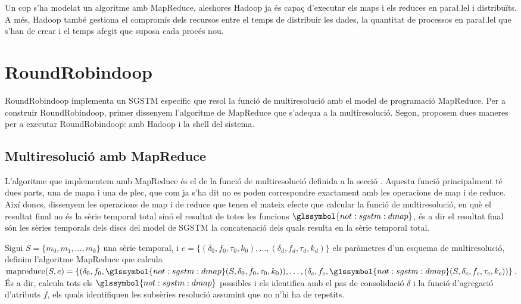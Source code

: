 Un cop s'ha modelat un algoritme amb MapReduce, aleshores Hadoop ja és
capaç d'executar els maps i els reduces en para\l.lel i distribuïts. A
més, Hadoop també gestiona el compromís dels recursos entre el temps
de distribuir les dades, la quantitat de processos en para\l.lel que
s'han de crear i el temps afegit que suposa cada procés nou.








\section{RoundRobindoop}


RoundRobindoop implementa un \gls{SGSTM} específic que resol la funció
de multiresolució amb el model de programació MapReduce.  Per a
construir RoundRobindoop, primer dissenyem l'algoritme de MapReduce
que s'adequa a la multiresolució. Segon, proposem dues maneres per a
executar RoundRobindoop: amb Hadoop i la shell del sistema.



\subsection{Multiresolució amb MapReduce}

L'algoritme que implementem amb MapReduce és el de la funció de
multiresolució definida a la secció . Aquesta funció principalment té dues
parts, una de mapa i una de plec, que com ja s'ha dit no es poden
correspondre exactament amb les operacions de map i de reduce. 
 Així
doncs, dissenyem les operacions de map i de reduce que tenen el mateix
efecte que calcular la funció de multiresolució, en què el resultat
final no és la sèrie temporal total sinó el resultat de totes les
funcions $\glssymbol{not:sgstm:dmap}$, és a dir el resultat final són
les sèries temporals dels discs del model de \gls{SGSTM} la
concatenació dels quals resulta en la sèrie temporal total.



Sigui $S=\{m_0,m_1,\dotsc,m_k\}$ una sèrie temporal, i $e = \{
(\delta_0,f_0,\tau_0,k_0),\ldots, (\delta_d,f_d,\tau_d,k_d)\}$ els
paràmetres d'un esquema de multiresolució, definim l'algoritme
MapReduce que calcula $\operatorname{mapreduce}(S,e) = \{
(\delta_0,f_0,
\glssymbol{not:sgstm:dmap}(S,\delta_0,f_0,\tau_0,k_0)),\dotsc,
(\delta_c,f_c,\glssymbol{not:sgstm:dmap}(S,\delta_c,f_c,\tau_c,k_c))
\}$. És a dir, calcula tots els $\glssymbol{not:sgstm:dmap}$ possibles
i els identifica amb el pas de consolidació $\delta$ i la funció
d'agregació d'atributs $f$, els quals identifiquen les subsèries
resolució assumint que no n'hi ha de repetits.





